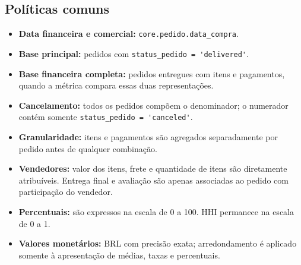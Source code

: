 \documentclass[12pt,a4paper]{article}
\providecommand{\tightlist}{
  \setlength{\itemsep}{0pt}\setlength{\parskip}{0pt}
}
\begin{document}
\subsection{Políticas
comuns}\label{docs__analytics__catalogo_metricas_analiticas.md__poluxedticas-comuns}

\begin{itemize}
\tightlist
\item
  \textbf{Data financeira e comercial:}
  \nolinkurl{core.pedido.data_compra}.
\item
  \textbf{Base principal:} pedidos com
  \nolinkurl{status_pedido = 'delivered'}.
\item
  \textbf{Base financeira completa:} pedidos entregues com itens e
  pagamentos, quando a métrica compara essas duas representações.
\item
  \textbf{Cancelamento:} todos os pedidos compõem o denominador; o
  numerador contém somente \nolinkurl{status_pedido = 'canceled'}.
\item
  \textbf{Granularidade:} itens e pagamentos são agregados separadamente
  por pedido antes de qualquer combinação.
\item
  \textbf{Vendedores:} valor dos itens, frete e quantidade de itens são
  diretamente atribuíveis. Entrega final e avaliação são apenas
  associadas ao pedido com participação do vendedor.
\item
  \textbf{Percentuais:} são expressos na escala de 0 a 100. HHI
  permanece na escala de 0 a 1.
\item
  \textbf{Valores monetários:} BRL com precisão exata; arredondamento é
  aplicado somente à apresentação de médias, taxas e percentuais.
\end{itemize}
\end{document}
